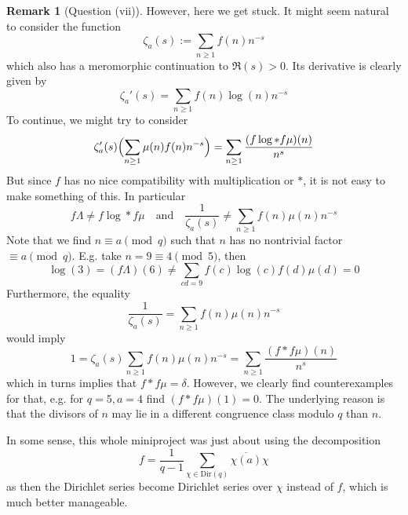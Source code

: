 \documentclass{scrartcl}
\theoremstyle{definition}
\newtheorem{remark}[definition]{Remark}
\begin{document}
\begin{remark}[Question (vii)]
    However, here we get stuck.
    It might seem natural to consider the function
    \begin{equation*}
        \zeta_a(s) := \sum_{n \geq 1} f(n) n^{-s}
    \end{equation*}
    which also has a meromorphic continuation to $\Re(s) > 0$.
    Its derivative is clearly given by
    \begin{equation*}
        \zeta_a'(s) = \sum_{n \geq 1} f(n) \log(n) n^{-s}
    \end{equation*}
    To continue, we might try to consider
    \begin{equation*}
        \zeta_a'(s)\Bigl( \sum_{n \geq 1} \mu(n) f(n) n^{-s} \Bigr) = \sum_{n \geq 1} \frac {(f\log * f\mu)(n)} {n^s}
    \end{equation*}
    But since $f$ has no nice compatibility with multiplication or $*$, it is not easy to make something of this.
    In particular
    \begin{equation*}
        f\Lambda \neq f\log * f\mu \quad \text{and} \quad \frac 1 {\zeta_a(s)} \neq \sum_{n \geq 1} f(n) \mu(n) n^{-s}
    \end{equation*}
    Note that we find $n \equiv a \pmod q$ such that $n$ has no nontrivial factor $\equiv a \pmod q$.
    E.g. take $n = 9 \equiv 4 \pmod 5$, then
    \begin{equation*}
        \log(3) = (f\Lambda)(6) \neq \sum_{cd = 9} f(c)\log(c)f(d)\mu(d) = 0
    \end{equation*}
    Furthermore, the equality
    \begin{equation*}
        \frac 1 {\zeta_a(s)} = \sum_{n \geq 1} f(n) \mu(n) n^{-s}
    \end{equation*}
    would imply
    \begin{equation*}
        1 = \zeta_a(s) \sum_{n \geq 1} f(n) \mu(n) n^{-s} = \sum_{n \geq 1} \frac {(f * f\mu)(n)} {n^s}
    \end{equation*}
    which in turns implies that $f * f\mu = \delta$.
    However, we clearly find counterexamples for that, e.g. for $q = 5, a = 4$ find $(f * f\mu)(1) = 0$.
    The underlying reason is that the divisors of $n$ may lie in a different congruence class modulo $q$ than $n$.

    In some sense, this whole miniproject was just about using the decomposition
    \begin{equation*}
        f = \frac 1 {q - 1} \sum_{\chi \in \mathrm{Dir}(q)} \overline{\chi(a)} \chi
    \end{equation*}
    as then the Dirichlet series become Dirichlet series over $\chi$ instead of $f$, which is much better manageable.
\end{remark}

\printbibliography
\end{document}
